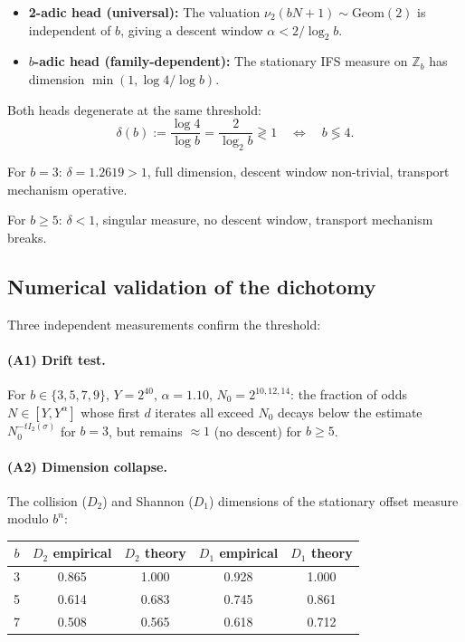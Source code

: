 \documentclass[12pt,a4paper]{article}
\begin{document}
\begin{itemize}
\item \textbf{2-adic head (universal):} The valuation $\nu_2(bN+1) \sim \mathrm{Geom}(2)$ 
is independent of $b$, giving a descent window $\alpha < 2/\log_2 b$.
\item \textbf{$b$-adic head (family-dependent):} The stationary IFS measure on 
$\mathbb{Z}_b$ has dimension $\min(1, \log 4 / \log b)$.
\end{itemize}

Both heads degenerate at the same threshold:
\[
\delta(b) := \frac{\log 4}{\log b} = \frac{2}{\log_2 b} \gtrless 1 
\quad \Longleftrightarrow \quad b \lessgtr 4.
\]

For $b=3$: $\delta = 1.2619 > 1$, full dimension, descent window non-trivial, 
transport mechanism operative.

For $b \ge 5$: $\delta < 1$, singular measure, no descent window, transport 
mechanism breaks.

\subsection{Numerical validation of the dichotomy}

Three independent measurements confirm the threshold:

\paragraph{(A1) Drift test.} For $b \in \{3, 5, 7, 9\}$, $Y = 2^{40}$, 
$\alpha = 1.10$, $N_0 = 2^{10,12,14}$: the fraction of odds $N \in [Y, Y^\alpha]$ 
whose first $d$ iterates all exceed $N_0$ decays below the estimate 
$N_0^{-t I_2(\sigma)}$ for $b=3$, but remains $\approx 1$ (no descent) for $b \ge 5$.

\paragraph{(A2) Dimension collapse.} The collision ($D_2$) and Shannon ($D_1$) 
dimensions of the stationary offset measure modulo $b^n$:

\begin{center}
\begin{tabular}{c|cc|cc}
$b$ & $D_2$ empirical & $D_2$ theory & $D_1$ empirical & $D_1$ theory \\ \hline
3 & 0.865 & 1.000 & 0.928 & 1.000 \\
5 & 0.614 & 0.683 & 0.745 & 0.861 \\
7 & 0.508 & 0.565 & 0.618 & 0.712 \\
\end{tabular}
\end{center}
\end{document}
